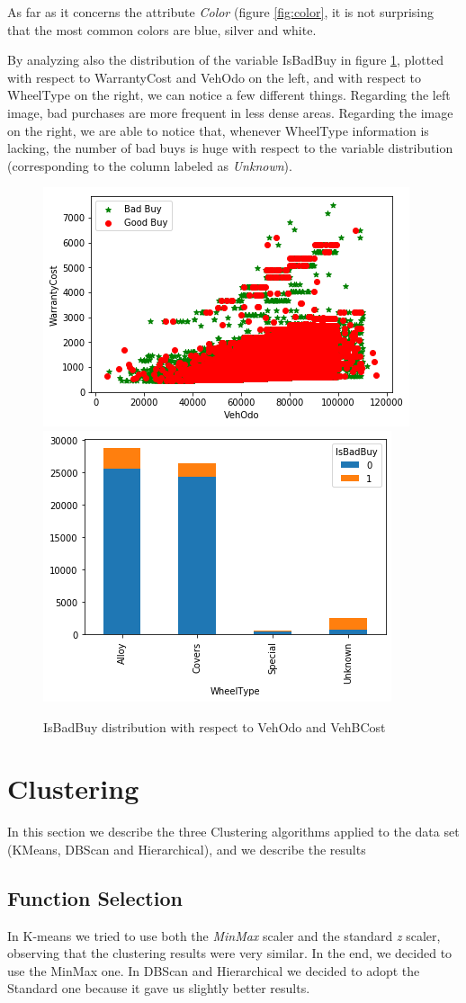 \documentclass{article}
\begin{document}
	
	As far as it concerns the attribute \emph{Color} (figure \ref{fig:color}, it is not surprising that the most common colors are blue, silver and white.
	
	
	By analyzing also the distribution of the variable IsBadBuy in figure \ref{fig:badbuys}, plotted with respect to WarrantyCost and VehOdo on the left, and with respect to WheelType on the right, we can notice a few different things. Regarding the left image, bad purchases are more frequent in less dense areas. Regarding the image on the right, we are able to notice that, whenever WheelType information is lacking, the number of bad buys is huge with respect to the variable distribution (corresponding to the column labeled as \emph{Unknown}).
	
	\begin{figure}[H]
		\centering
		\includegraphics[width=.49\textwidth, keepaspectratio]{badbuys}
		\includegraphics[width=.41\textwidth, keepaspectratio]{wheeltype}
		\caption{IsBadBuy distribution with respect to VehOdo and VehBCost}
		\label{fig:badbuys}
	\end{figure}
	
	
	
	\section{Clustering}
	\label{sec:clustering}
	In this section we describe the three Clustering algorithms applied to the data set (KMeans, DBScan and Hierarchical), and we describe the results
	
	\subsection{Function Selection}
	In K-means we tried to use both the \emph{MinMax} scaler and the standard \emph{z} scaler, observing that the clustering results were very similar. In the end, we decided to use the MinMax one.
	In DBScan and Hierarchical we decided to adopt the Standard one because it gave us slightly better results.
	
\end{document}
